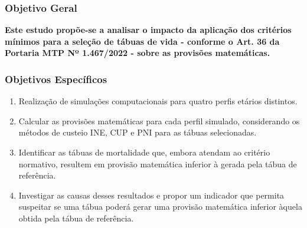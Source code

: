 \documentclass[11pt]{beamer}
\begin{document}
    \begin{frame}

        \frametitle{Objetivo Geral}

        \textbf{Este estudo propõe-se a analisar o impacto da aplicação dos critérios mínimos para a seleção de tábuas de vida - conforme o Art. 36 da Portaria MTP Nº 1.467/2022 - sobre as provisões matemáticas.}

    \end{frame}
    
    \begin{frame}

        \frametitle{Objetivos Específicos}

            \begin{enumerate}
                \item Realização de simulações computacionais para quatro perfis etários distintos.

                \item Calcular as provisões matemáticas para cada perfil simulado, considerando os métodos de custeio INE, CUP e PNI para as tábuas selecionadas.
                
                \item Identificar as tábuas de mortalidade que, embora atendam ao critério normativo, resultem em provisão matemática inferior à gerada pela tábua de referência.
                
                \item Investigar as causas desses resultados e propor um indicador que permita suspeitar se uma tábua poderá gerar uma provisão matemática inferior àquela obtida pela tábua de referência.

            \end{enumerate}

    \end{frame}
\end{document}
